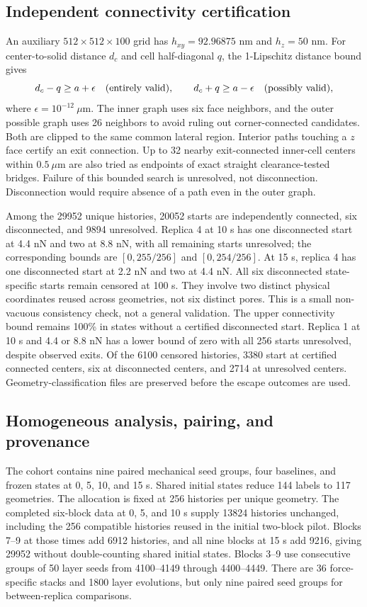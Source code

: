 \documentclass[a4paper,10pt]{article}
\numberwithin{equation}{section}
\begin{document}
\subsection*{Independent connectivity certification}
An auxiliary $512\times512\times100$ grid has $h_{xy}=92.96875$ nm and $h_z=50$ nm. For center-to-solid distance $d_c$ and cell half-diagonal $q$, the 1-Lipschitz distance bound gives
\begin{equation}
d_c-q\ge a+\epsilon\quad\hbox{(entirely valid)},\qquad
d_c+q\ge a-\epsilon\quad\hbox{(possibly valid)},
\end{equation}
where $\epsilon=10^{-12}~\mu$m. The inner graph uses six face neighbors, and the outer possible graph uses 26 neighbors to avoid ruling out corner-connected candidates. Both are clipped to the same common lateral region. Interior paths touching a $z$ face certify an exit connection. Up to 32 nearby exit-connected inner-cell centers within $0.5~\mu$m are also tried as endpoints of exact straight clearance-tested bridges. Failure of this bounded search is unresolved, not disconnection. Disconnection would require absence of a path even in the outer graph.

Among the 29952 unique histories, 20052 starts are independently connected, six disconnected, and 9894 unresolved. Replica 4 at 10 s has one disconnected start at 4.4 nN and two at 8.8 nN, with all remaining starts unresolved; the corresponding bounds are $[0,255/256]$ and $[0,254/256]$. At 15 s, replica 4 has one disconnected start at 2.2 nN and two at 4.4 nN. All six disconnected state-specific starts remain censored at 100 s. They involve two distinct physical coordinates reused across geometries, not six distinct pores. This is a small non-vacuous consistency check, not a general validation. The upper connectivity bound remains 100\% in states without a certified disconnected start. Replica 1 at 10 s and 4.4 or 8.8 nN has a lower bound of zero with all 256 starts unresolved, despite observed exits. Of the 6100 censored histories, 3380 start at certified connected centers, six at disconnected centers, and 2714 at unresolved centers. Geometry-classification files are preserved before the escape outcomes are used.

\subsection*{Homogeneous analysis, pairing, and provenance}
The cohort contains nine paired mechanical seed groups, four baselines, and frozen states at 0, 5, 10, and 15 s. Shared initial states reduce 144 labels to 117 geometries. The allocation is fixed at 256 histories per unique geometry. The completed six-block data at 0, 5, and 10 s supply 13824 histories unchanged, including the 256 compatible histories reused in the initial two-block pilot. Blocks 7--9 at those times add 6912 histories, and all nine blocks at 15 s add 9216, giving 29952 without double-counting shared initial states. Blocks 3--9 use consecutive groups of 50 layer seeds from 4100--4149 through 4400--4449. There are 36 force-specific stacks and 1800 layer evolutions, but only nine paired seed groups for between-replica comparisons.
\end{document}
